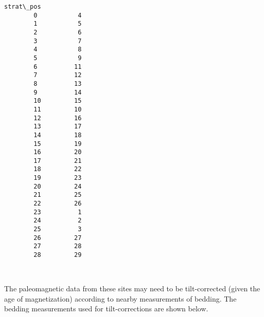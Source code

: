\documentclass[11pt]{article}
\begin{document}
\begin{Verbatim}[commandchars=\\\{\}]
            strat\_pos  
        0           4  
        1           5  
        2           6  
        3           7  
        4           8  
        5           9  
        6          11  
        7          12  
        8          13  
        9          14  
        10         15  
        11         10  
        12         16  
        13         17  
        14         18  
        15         19  
        16         20  
        17         21  
        18         22  
        19         23  
        20         24  
        21         25  
        22         26  
        23          1  
        24          2  
        25          3  
        26         27  
        27         28  
        28         29  
\end{Verbatim}
        

    \begin{center}
    \end{center}
    { \hspace*{\fill} \\}
    
    The paleomagnetic data from these sites may need to be tilt-corrected
(given the age of magnetization) according to nearby measurements of
bedding. The bedding measurements used for tilt-corrections are shown
below.
\end{document}
